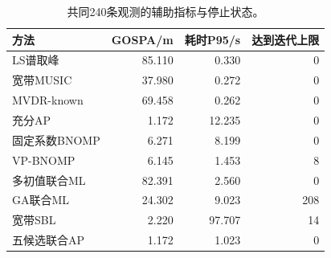 \begin{table}[htbp]\centering\small
\caption{共同240条观测的辅助指标与停止状态。}\label{tab:auxiliary}
\begin{tabular}{@{}lrrr@{}}\toprule
方法 & GOSPA/m & 耗时P95/s & 达到迭代上限\\\midrule
LS谱取峰 & 85.110 & 0.330 & 0\\
宽带MUSIC & 37.980 & 0.272 & 0\\
MVDR-known & 69.458 & 0.262 & 0\\
充分AP & 1.172 & 12.235 & 0\\
固定系数BNOMP & 6.271 & 8.199 & 0\\
VP-BNOMP & 6.145 & 1.453 & 8\\
多初值联合ML & 82.391 & 2.560 & 0\\
GA联合ML & 24.302 & 9.023 & 208\\
宽带SBL & 2.220 & 97.707 & 14\\
五候选联合AP & 1.172 & 1.023 & 0\\
\bottomrule\end{tabular}\end{table}
